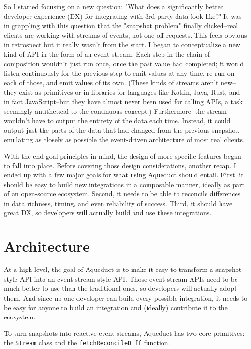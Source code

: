 \documentclass[manuscript,review,anonymous]{acmart}
\begin{document}
So I started focusing on a new question: "What does a significantly better developer experience (DX) for integrating with 3rd party data look like?" It was in grappling with this question that the "snapshot problem" finally clicked--real clients are working with streams of events, not one-off requests. This feels obvious in retrospect but it really wasn't from the start. I began to conceptualize a new kind of API in the form of an event stream. Each step in the chain of composition wouldn't just run once, once the past value had completed; it would listen continuously for the previous step to emit values at any time, re-run on each of those, and emit values of its own. (These kinds of streams aren't new--they exist as primitives or in libraries for languages like Kotlin, Java, Rust, and in fact JavaScript--but they have almost never been used for calling APIs, a task seemingly antithetical to the continuous concept.)  Furthermore, the stream wouldn't have to output the entirety of the data each time. Instead, it could output just the parts of the data that had changed from the previous snapshot, emulating as closely as possible the event-driven architecture of most real clients.

With the end goal principles in mind, the design of more specific features began to fall into place. Before covering those design considerations, another recap. I ended up with a few major goals for what using Aqueduct should entail. First, it should be easy to build new integrations in a composable manner, ideally as part of an open-source ecosystem. Second, it needs to be able to reconcile differences in data richness, timing, and even reliability of success. Third, it should have great DX, so developers will actually build and use these integrations.

\section{Architecture}
At a high level, the goal of Aqueduct is to make it easy to transform a snapshot-style API into an event stream-style API. Those event stream APIs need to be much better to use than the traditional ones, so developers will actually adopt them. And since no one developer can build every possible integration, it needs to be easy for anyone to build an integration and (ideally) contribute it to the ecosystem.

To turn snapshots into reactive event streams, Aqueduct has two core primitives: the \texttt{Stream} class and the \texttt{fetchReconcileDiff} function. 
\end{document}

